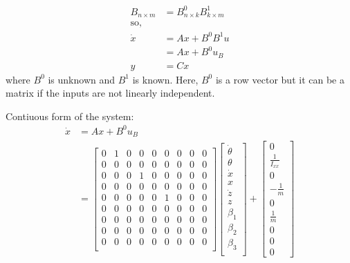 \documentclass[12pt]{article}
\begin{document}
\begin{align*}
    B_{n \times m} &= B^{0}_{n \times k} B^{1}_{k \times m} \\ 
    \text{so,}  \\
    \dot{x} &= Ax + B^{0} B^{1} u \\
    &= Ax + B^{0} u_{B} \\
    y &= Cx 
\end{align*}
where $B^{0}$ is unknown and $B^{1}$ is known. Here, $B^{0}$ is a row vector but it can be a matrix if the inputs are not linearly independent.

Contiuous form of the system:
\begin{align*}
    \dot{x} &= Ax + B^{0} u_{B} \\
    &= \begin{bmatrix}
        0 & 1 & 0 & 0 & 0 & 0 & 0 & 0 & 0 \\
        0 & 0 & 0 & 0 & 0 & 0 & 0 & 0 & 0 \\
        0 & 0 & 0 & 1 & 0 & 0 & 0 & 0 & 0 \\
        0 & 0 & 0 & 0 & 0 & 0 & 0 & 0 & 0 \\
        0 & 0 & 0 & 0 & 0 & 1 & 0 & 0 & 0 \\
        0 & 0 & 0 & 0 & 0 & 0 & 0 & 0 & 0 \\
        0 & 0 & 0 & 0 & 0 & 0 & 0 & 0 & 0 \\
        0 & 0 & 0 & 0 & 0 & 0 & 0 & 0 & 0 \\
        0 & 0 & 0 & 0 & 0 & 0 & 0 & 0 & 0 \\
    \end{bmatrix} \begin{bmatrix}
        \dot{\theta} \\
        \theta \\
        \dot{x} \\
        x \\
        \dot{z} \\
        z \\
        \beta_1 \\
        \beta_2 \\
        \beta_3 \\
    \end{bmatrix} + \begin{bmatrix}
        0 \\ \frac{1}{I_{xx}} \\ 0 \\ -\frac{1}{m} \\ 0 \\ \frac{1}{m} \\  0 \\ 0 \\ 0

\end{bmatrix}
\end{align*}
\end{document}
